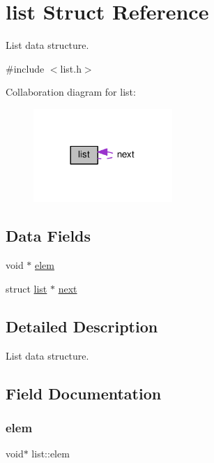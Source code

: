 \hypertarget{structlist}{}\section{list Struct Reference}
\label{structlist}


List data structure.  




{\ttfamily \#include $<$list.\+h$>$}



Collaboration diagram for list\+:\nopagebreak
\begin{figure}[H]
\begin{center}
\leavevmode
\includegraphics[width=149pt]{structlist__coll__graph}
\end{center}
\end{figure}
\subsection*{Data Fields}
\begin{DoxyCompactItemize}
\item 
void $\ast$ \hyperlink{structlist_af3f79a2886a3f27cdfdfa202c2affc68}{elem}
\item 
struct \hyperlink{structlist}{list} $\ast$ \hyperlink{structlist_a1900fe79e875e2838625b2eb60837f8f}{next}
\end{DoxyCompactItemize}


\subsection{Detailed Description}
List data structure. 

\subsection{Field Documentation}
\mbox{\label{structlist_af3f79a2886a3f27cdfdfa202c2affc68}} 
\subsubsection{\texorpdfstring{elem}{elem}}
{\footnotesize\ttfamily void$\ast$ list\+::elem}

